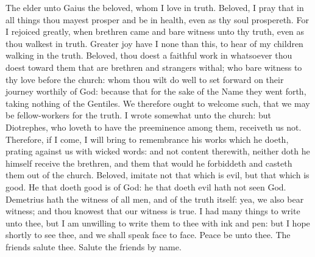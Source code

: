 


The elder unto Gaius the beloved, whom I love in truth.  Beloved, I pray that in all things thou mayest prosper and be in health, even as thy soul prospereth. For I rejoiced greatly, when brethren came and bare witness unto thy truth, even as thou walkest in truth. Greater joy have I none than this, to hear of my children walking in the truth.  Beloved, thou doest a faithful work in whatsoever thou doest toward them that are brethren and strangers withal; who bare witness to thy love before the church: whom thou wilt do well to set forward on their journey worthily of God: because that for the sake of the Name they went forth, taking nothing of the Gentiles. We therefore ought to welcome such, that we may be fellow-workers for the truth.  I wrote somewhat unto the church: but Diotrephes, who loveth to have the preeminence among them, receiveth us not. Therefore, if I come, I will bring to remembrance his works which he doeth, prating against us with wicked words: and not content therewith, neither doth he himself receive the brethren, and them that would he forbiddeth and casteth them out of the church. Beloved, imitate not that which is evil, but that which is good. He that doeth good is of God: he that doeth evil hath not seen God. Demetrius hath the witness of all men, and of the truth itself: yea, we also bear witness; and thou knowest that our witness is true.  I had many things to write unto thee, but I am unwilling to write them to thee with ink and pen: but I hope shortly to see thee, and we shall speak face to face. Peace be unto thee. The friends salute thee. Salute the friends by name. 
